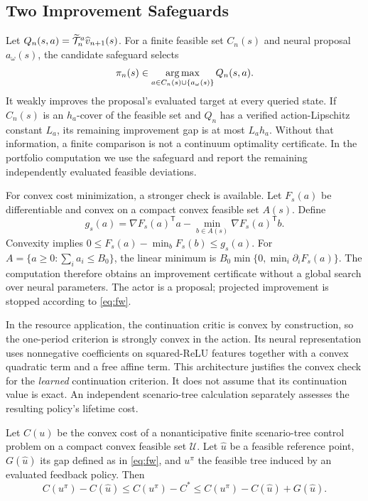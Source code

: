 \subsection{Two Improvement Safeguards}
Let $Q_n(s,a)=\widetilde{\mathcal T}_n^a\widehat v_{n+1}(s)$. For a finite feasible set $C_n(s)$ and neural proposal $a_\omega(s)$, the candidate safeguard selects
\begin{equation}
 \pi_n(s)\in\operatorname*{arg\,max}_{a\in C_n(s)\cup\{a_\omega(s)\}}Q_n(s,a).
 \label{eq:candidate}
\end{equation}
It weakly improves the proposal's evaluated target at every queried state. If $C_n(s)$ is an $h_a$-cover of the feasible set and $Q_n$ has a verified action-Lipschitz constant $L_a$, its remaining improvement gap is at most $L_a h_a$. Without that information, a finite comparison is not a continuum optimality certificate. In the portfolio computation we use the safeguard and report the remaining independently evaluated feasible deviations.

For convex cost minimization, a stronger check is available. Let $F_s(a)$ be differentiable and convex on a compact convex feasible set $A(s)$. Define
\begin{equation}
 g_s(a)=\nabla F_s(a)^{\mathsf T}a
        -\min_{b\in A(s)}\nabla F_s(a)^{\mathsf T}b.
 \label{eq:fw}
\end{equation}
Convexity implies $0\leq F_s(a)-\min_bF_s(b)\leq g_s(a)$. For $A=\{a\geq0:\sum_i a_i\leq B_0\}$, the linear minimum is $B_0\min\{0,\min_i\partial_iF_s(a)\}$. The computation therefore obtains an improvement certificate without a global search over neural parameters. The actor is a proposal; projected improvement is stopped according to \eqref{eq:fw}.

In the resource application, the continuation critic is convex by construction, so the one-period criterion is strongly convex in the action. Its neural representation uses nonnegative coefficients on squared-ReLU features together with a convex quadratic term and a free affine term. This architecture justifies the convex check for the \emph{learned} continuation criterion. It does not assume that its continuation value is exact. An independent scenario-tree calculation separately assesses the resulting policy's lifetime cost.

\begin{proposition}
\label{thm:convex_certificate}
Let $C(u)$ be the convex cost of a nonanticipative finite scenario-tree control problem on a compact convex feasible set $\mathcal U$. Let $\widehat u$ be a feasible reference point, $G(\widehat u)$ its gap defined as in \eqref{eq:fw}, and $u^\pi$ the feasible tree induced by an evaluated feedback policy. Then
\begin{equation}
 C(u^\pi)-C(\widehat u)
 \leq C(u^\pi)-C^*
 \leq C(u^\pi)-C(\widehat u)+G(\widehat u).
 \label{eq:tree_certificate}
\end{equation}
\end{proposition}

